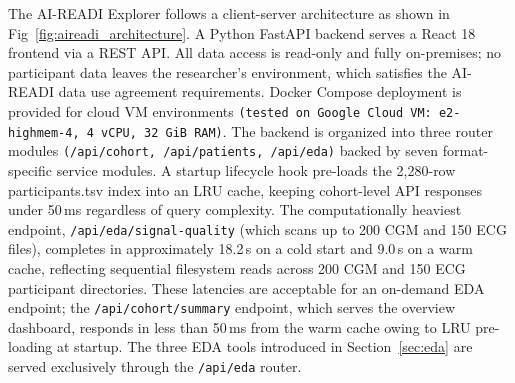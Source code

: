 \documentclass[conference]{IEEEtran}
\begin{document}
The AI-READI Explorer follows a client-server architecture as shown in Fig~\ref{fig:aireadi_architecture}. A Python FastAPI \cite{noauthor_fastapi_nodate} backend serves a React 18 frontend via a REST API. All data access is read-only and fully on-premises; no participant data leaves the researcher’s environment, which satisfies the AI-READI data use agreement requirements. Docker Compose deployment is provided for cloud VM environments \texttt{(tested on Google Cloud VM: e2-highmem-4, 4\,vCPU, 32\,GiB RAM)}. The backend is organized into three router modules \texttt{(/api/cohort, /api/patients, /api/eda)} backed by seven format-specific service modules. A startup lifecycle hook pre-loads the 2,280-row participants.tsv index into an LRU cache, keeping cohort-level API responses under 50\,ms regardless of query complexity. The computationally heaviest endpoint, \texttt{/api/eda/signal-quality} (which scans up to 200 CGM and 150 ECG files), completes in approximately 18.2\,s on a cold start and 9.0\,s on a warm cache, reflecting sequential filesystem reads across 200 CGM and 150 ECG participant directories. These latencies are acceptable for an on-demand EDA endpoint; the \texttt{/api/cohort/summary} endpoint, which serves the overview dashboard, responds in less than 50\,ms from the warm cache owing to LRU pre-loading at startup. The three EDA tools introduced in Section~\ref{sec:eda} are served exclusively through the \texttt{/api/eda} router.
\end{document}
